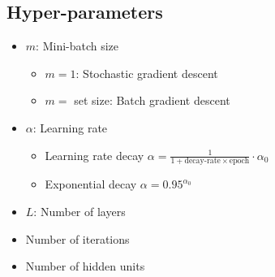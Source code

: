 \subsection{Hyper-parameters}
\begin{frame}{\insertsubsec}
    \begin{itemize}
        \item $m$: Mini-batch size
        \begin{itemize}
            \item $m = 1$: Stochastic gradient descent
            \item $m = $ set size: Batch gradient descent
        \end{itemize}
        \item $\alpha$: Learning rate
        \begin{itemize}
            \item Learning rate decay 
            $\alpha = \frac{1}{1 + \text{decay-rate}\times \text{epoch}} \cdot \alpha_0$
            \item Exponential decay
            $\alpha = 0.95^{\alpha_0}$

        \end{itemize}
        \item $L$: Number of layers
        \item Number of iterations
        \item Number of hidden units
    \end{itemize}
\end{frame}
